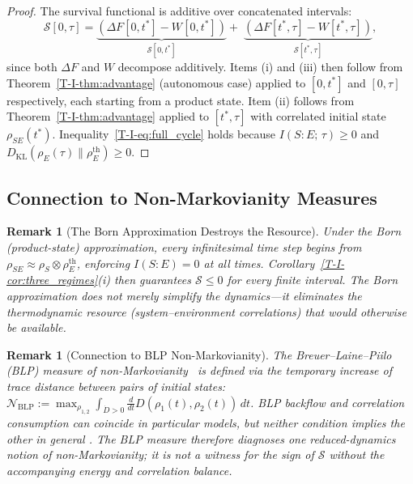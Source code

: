 \documentclass[12pt,a4paper,openany]{book}
\newtheorem{remark}[theorem]{Remark}
\begin{document}
\begin{proof}
The survival functional is additive over concatenated
intervals:
\[
\mathcal{S}[0,\tau]
= \underbrace{(\Delta F[0,t^*] - W[0,t^*])}_{\mathcal{S}[0,t^*]}
  +\; \underbrace{(\Delta F[t^*,\tau] - W[t^*,\tau])}_{\mathcal{S}[t^*,\tau]},
\]
since both $\Delta F$ and $W$ decompose additively.
Items (i) and (iii) then follow from
Theorem~\ref{T-I-thm:advantage} (autonomous case) applied to
$[0,t^*]$ and $[0,\tau]$ respectively, each starting from
a product state.
Item (ii) follows from Theorem~\ref{T-I-thm:advantage} applied
to $[t^*,\tau]$ with correlated initial state
$\rho_{SE}(t^*)$.
Inequality~\eqref{T-I-eq:full_cycle} holds because
$I(S{:}E;\,\tau) \geq 0$ and
$D_{\mathrm{KL}}(\rho_E(\tau)\|\rho_E^{\mathrm{th}}) \geq 0$.
\end{proof}

\subsection{Connection to Non-Markovianity Measures}

\begin{remark}[The Born Approximation Destroys the Resource]
\label{T-I-rem:born_kills}
Under the Born (product-state) approximation, every
infinitesimal time step begins from
$\rho_{SE} \approx \rho_S \otimes \rho_E^{\mathrm{th}}$,
enforcing $I(S{:}E) = 0$ at all times.
Corollary~\ref{T-I-cor:three_regimes}(i) then guarantees
$\mathcal{S} \leq 0$ for \emph{every} finite interval.
The Born approximation does not merely simplify the
dynamics---it \emph{eliminates the thermodynamic resource}
(system--environment correlations) that would otherwise be
available.
\end{remark}

\begin{remark}[Connection to BLP Non-Markovianity]
\label{T-I-rem:BLP}
The Breuer--Laine--Piilo (BLP) measure of
non-Markovianity~\cite{BreuerLainePiilo2009} is defined via
the temporary increase of trace distance between pairs of
initial states:
$\mathcal{N}_{\mathrm{BLP}} := \max_{\rho_{1,2}}
\int_{\dot{D}>0} \frac{d}{dt}
D(\rho_1(t),\rho_2(t))\, dt$.
BLP backflow and correlation consumption can coincide in particular
models, but neither condition implies the other in general
\cite{RivasHuelgaPlenio2014}.  The BLP measure therefore diagnoses one
reduced-dynamics notion of non-Markovianity; it is not a witness for the
sign of $\mathcal S$ without the accompanying energy and correlation
balance.
\end{remark}
\end{document}

